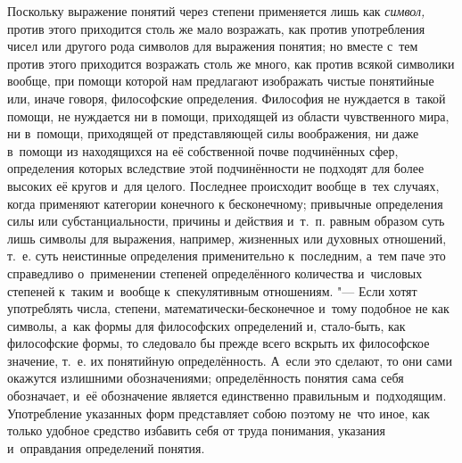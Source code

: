 Поскольку выражение понятий через степени применяется лишь как {\em символ,}
против этого приходится столь же мало возражать, как против употребления чисел
или другого рода символов для выражения понятия; но вместе с~тем против этого
приходится возражать столь же много, как против всякой символики вообще, при
помощи которой нам предлагают изображать чистые понятийные или, иначе говоря,
философские определения. Философия не нуждается в~такой помощи, не нуждается ни
в помощи, приходящей из области чувственного мира, ни в~помощи, приходящей от
представляющей силы воображения, ни даже в~помощи из находящихся на её
собственной почве подчинённых сфер, определения которых вследствие этой
подчинённости не подходят для более высоких её кругов и~для целого. Последнее
происходит вообще в~тех случаях, когда применяют категории конечного к
бесконечному; привычные определения силы или субстанциальности, причины и
действия и~т.~п. равным образом суть лишь символы для выражения, например,
жизненных или духовных отношений, т.~е. суть неистинные определения
применительно к~последним, а~тем паче это справедливо о~применении степеней
определённого количества и~числовых степеней к~таким и~вообще к~спекулятивным
отношениям. "--- Если хотят употреблять числа, степени,
математически-бесконечное и~тому подобное не как символы, а~как формы для
философских определений и, стало-быть, как философские формы, то следовало бы
прежде всего вскрыть их философское значение, т.~е. их понятийную
определённость. А~если это сделают, то они сами окажутся излишними
обозначениями; определённость понятия сама себя обозначает, и~её обозначение
является единственно правильным и~подходящим. Употребление указанных форм
представляет собою поэтому не~что иное, как только удобное средство избавить
себя от труда понимания, указания и~оправдания определений понятия.

\bigskip

